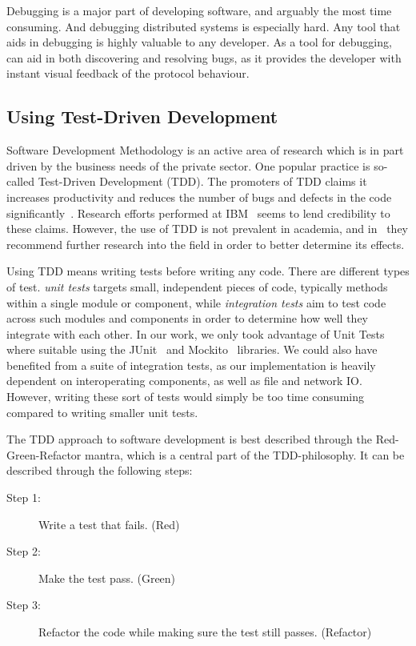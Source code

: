 Debugging is a major part of developing software, and arguably the most
time consuming. And debugging distributed systems is especially hard.
Any tool that aids in debugging is highly valuable to any developer. As
a tool for debugging, \demo can aid in both discovering and resolving
bugs, as it provides the developer with instant visual feedback of the
protocol behaviour.


\subsection{Using Test-Driven Development}

Software Development Methodology is an active area of research
which is in part driven by the business needs of the private
sector\cite{janzen2005test}. One popular practice is so-called Test-Driven
Development (TDD). The promoters of TDD claims it increases
productivity and reduces the number of bugs and defects in the
code significantly~\cite{beck2003test}. Research
efforts performed at IBM~\cite{maximilien2003assessing} seems to
lend credibility to these claims. However, the use of TDD is not
prevalent in academia, and in~\cite{janzen2005test} they
recommend further research into the field in order to better
determine its effects.

Using TDD means writing tests before writing any code. There are
different types of test. \emph{unit tests} targets small,
independent pieces of code, typically methods within a single
module or component, while \emph{integration tests} aim to test
code across such modules and components in order to determine
how well they integrate with each other. In our work, we only
took advantage of Unit Tests where suitable using the
JUnit~\cite{junit} and Mockito~\cite{mockito} libraries.
We could also have benefited from a suite of integration tests,
as our implementation is heavily dependent on interoperating
components, as well as file and network IO\@. However, writing
these sort of tests would simply be too time consuming compared
to writing smaller unit tests.

The TDD approach to software development is best described through the
Red-Green-Refactor mantra, which is a central part of the
TDD-philosophy. It can be described through the following steps:

\begin{description}
    \item[Step 1:] Write a test that fails. (Red)
    \item[Step 2:] Make the test pass. (Green)
    \item[Step 3:] Refactor the code while making sure the test
        still passes. (Refactor)
\end{description}


